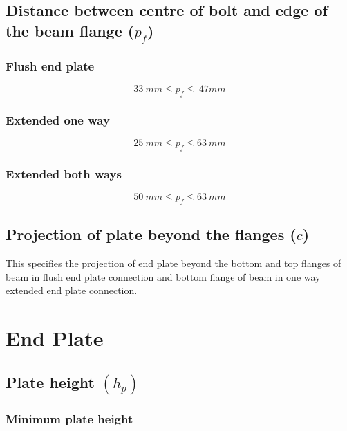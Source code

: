 \documentclass[11.5pt,a4paper,oneside]{report}
\begin{document}
\begin{Form}
\section{Distance between centre of bolt and edge of the beam flange ($p_{f}$)}
	
		\subsection{Flush end plate}
		\qquad {}
			\begin{equation}
				33~mm \leq p_{f} \leq~47 mm
			\end{equation}
			
		\subsection{Extended one way}
		\qquad {}
			\begin{equation}
				25~mm \leq p_{f} \leq 63~mm
			\end{equation}

		\subsection{Extended both ways}
		\qquad {}
			\begin{equation}
				50~mm \leq p_{f} \leq 63~mm
			\end{equation}
\section{Projection of plate beyond the flanges ($c$)}
\label{projection}
This specifies the projection of end plate beyond the bottom and top flanges of beam in flush end plate connection and bottom flange of beam in one way extended end plate connection.


\chapter{End Plate} 
\section{Plate height \boldmath $(h_{p})$}
	\subsection{Minimum plate height}
	\qquad {} \\ \\

\end{Form}
\end{document}
